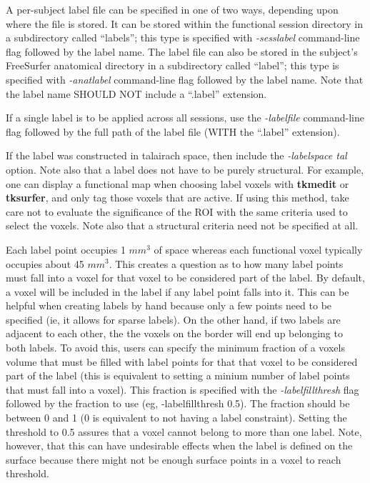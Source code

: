 \documentclass[10pt]{article}
\begin{document}
A per-subject label file can be specified in one of two ways,
depending upon where the file is stored. It can be stored within the
functional session directory in a subdirectory called ``labels''; this
type is specified with {\em -sesslabel} command-line flag followed by
the label name. The label file can also be stored in the subject's
FreeSurfer anatomical directory in a subdirectory called ``label'';
this type is specified with {\em -anatlabel} command-line flag
followed by the label name. Note that the label name SHOULD NOT
include a ``.label'' extension.

If a single label is to be applied across all sessions, use the {\em
-labelfile} command-line flag followed by the full path of the label
file (WITH the ``.label'' extension). 

If the label was constructed in talairach space, then include the {\em
-labelspace tal} option. Note also that a label does not have to be
purely structural. For example, one can display a functional map when
choosing label voxels with {\bf tkmedit} or {\bf tksurfer}, and only
tag those voxels that are active. If using this method, take care not
to evaluate the significance of the ROI with the same criteria used to
select the voxels. Note also that a structural criteria need not be
specified at all.

Each label point occupies 1 $mm^3$ of space whereas each functional
voxel typically occupies about 45 $mm^3$. This creates a question as
to how many label points must fall into a voxel for that voxel to be
considered part of the label. By default, a voxel will be included in
the label if any label point falls into it. This can be helpful when
creating labels by hand because only a few points need to be specified
(ie, it allows for sparse labels). On the other hand, if two labels
are adjacent to each other, the the voxels on the border will end up
belonging to both labels. To avoid this, users can specify the minimum
fraction of a voxels volume that must be filled with label points for
that that voxel to be considered part of the label (this is equivalent
to setting a minium number of label points that must fall into a
voxel). This fraction is specified with the {\em -labelfillthresh}
flag followed by the fraction to use (eg, -labelfillthresh 0.5). The
fraction should be between 0 and 1 (0 is equivalent to not having a
label constraint). Setting the threshold to 0.5 assures that a voxel
cannot belong to more than one label. Note, however, that this can 
have undesirable effects when the label is defined on the surface
because there might not be enough surface points in a voxel to reach
threshold.\\
\end{document}
